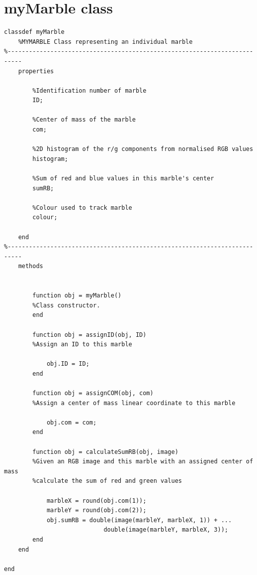 \documentclass[10pt,a4paper,onecolumn]{report}
\begin{document}
\section{myMarble class}
\begin{lstlisting}
classdef myMarble
    %MYMARBLE Class representing an individual marble
%-------------------------------------------------------------------------- 
    properties
        
        %Identification number of marble
        ID;
        
        %Center of mass of the marble
        com;
        
        %2D histogram of the r/g components from normalised RGB values
        histogram;
        
        %Sum of red and blue values in this marble's center
        sumRB;
        
        %Colour used to track marble
        colour;
        
    end
%--------------------------------------------------------------------------    
    methods
        
        
        function obj = myMarble()
        %Class constructor.
        end
        
        function obj = assignID(obj, ID)
        %Assign an ID to this marble
        
            obj.ID = ID;
        end
        
        function obj = assignCOM(obj, com)
        %Assign a center of mass linear coordinate to this marble
            
            obj.com = com;
        end
        
        function obj = calculateSumRB(obj, image)
        %Given an RGB image and this marble with an assigned center of mass
        %calculate the sum of red and green values
        
            marbleX = round(obj.com(1));
            marbleY = round(obj.com(2));
            obj.sumRB = double(image(marbleY, marbleX, 1)) + ...
                            double(image(marbleY, marbleX, 3));
        end
    end
    
end
\end{lstlisting}
\end{document}
